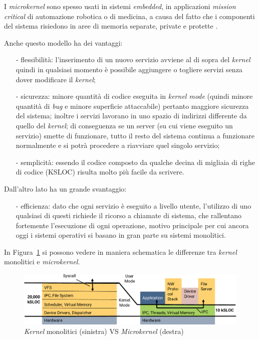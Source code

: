 I \textit{microkernel} sono spesso usati in sistemi \textit{embedded}, in applicazioni \textit{mission critical} di automazione robotica o di medicina, a causa del fatto che i componenti del sistema risiedono in aree di memoria separate, private e protette \cite{kernelWikipedia}.

Anche questo modello ha dei vantaggi:
\begin{itemize}
	\item[-] flessibilità: l'inserimento di un nuovo servizio avviene al di sopra del \textit{kernel} quindi in qualsiasi momento è possibile aggiungere o togliere servizi senza dover modificare il \textit{kernel};
	\item[-] sicurezza: minore quantità di codice eseguita in \textit{kernel mode} (quindi minore quantità di \textit{bug} e minore superficie attaccabile) pertanto maggiore sicurezza del sistema; inoltre i servizi lavorano in uno spazio di indirizzi differente da quello del \textit{kernel}; di conseguenza se un server (su cui viene eseguito un servizio) smette di funzionare, tutto il resto del sistema continua a funzionare normalmente e si potrà procedere a riavviare quel singolo servizio;
	\item[-] semplicità: essendo il codice composto da qualche decina di migliaia di righe di codice (KSLOC) risulta molto più facile da scrivere.
\end{itemize}
Dall'altro lato ha un grande svantaggio:
\begin{itemize}
	\item[-] efficienza: dato che ogni servizio è eseguito a livello utente, l'utilizzo di uno qualsiasi di questi richiede il ricorso a chiamate di sistema, che rallentano fortemente l'esecuzione di ogni operazione, motivo principale per cui ancora oggi i sistemi operativi si basano in gran parte su sistemi monolitici.
\end{itemize}
In Figura~\ref{fig:MonolithicVSmicrokernel} si possono vedere in maniera schematica le differenze tra \textit{kernel} monolitici e \textit{microkernel}.

\begin{figure}[h]
  \includegraphics[width=\linewidth]{img/MonolithicVSmicrokernel.png}
  \caption{\textit{Kernel} monolitici (sinistra) VS \textit{Microkernel} (destra)}
  \label{fig:MonolithicVSmicrokernel}
\end{figure}
\newpage

